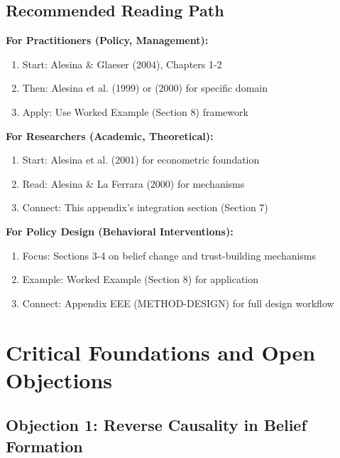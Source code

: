 \subsection{Recommended Reading Path}

\textbf{For Practitioners (Policy, Management):}
\begin{enumerate}
\item Start: Alesina \& Glaeser (2004), Chapters 1-2
\item Then: Alesina et al. (1999) or (2000) for specific domain
\item Apply: Use Worked Example (Section 8) framework
\end{enumerate}

\textbf{For Researchers (Academic, Theoretical):}
\begin{enumerate}
\item Start: Alesina et al. (2001) for econometric foundation
\item Read: Alesina \& La Ferrara (2000) for mechanisms
\item Connect: This appendix's integration section (Section 7)
\end{enumerate}

\textbf{For Policy Design (Behavioral Interventions):}
\begin{enumerate}
\item Focus: Sections 3-4 on belief change and trust-building mechanisms
\item Example: Worked Example (Section 8) for application
\item Connect: Appendix EEE (METHOD-DESIGN) for full design workflow
\end{enumerate}

\clearpage



\section{Critical Foundations and Open Objections}
\label{sec:alesina-foundations}

\subsection{Objection 1: Reverse Causality in Belief Formation}

